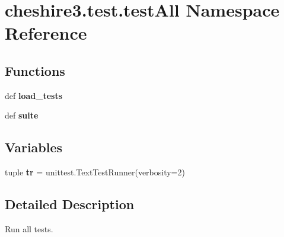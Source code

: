 \hypertarget{namespacecheshire3_1_1test_1_1test_all}{\section{cheshire3.\-test.\-test\-All Namespace Reference}
\label{namespacecheshire3_1_1test_1_1test_all}
}
\subsection*{Functions}
\begin{DoxyCompactItemize}
\item 
\hypertarget{namespacecheshire3_1_1test_1_1test_all_af7799fe65e7caad33ca065616dc9ead7}{def {\bfseries load\-\_\-tests}}\label{namespacecheshire3_1_1test_1_1test_all_af7799fe65e7caad33ca065616dc9ead7}

\item 
\hypertarget{namespacecheshire3_1_1test_1_1test_all_af9aaeda494ef46c1dd183532aa1a5b20}{def {\bfseries suite}}\label{namespacecheshire3_1_1test_1_1test_all_af9aaeda494ef46c1dd183532aa1a5b20}

\end{DoxyCompactItemize}
\subsection*{Variables}
\begin{DoxyCompactItemize}
\item 
\hypertarget{namespacecheshire3_1_1test_1_1test_all_a01215ea2dd6820c4c2589055487998a7}{tuple {\bfseries tr} = unittest.\-Text\-Test\-Runner(verbosity=2)}\label{namespacecheshire3_1_1test_1_1test_all_a01215ea2dd6820c4c2589055487998a7}

\end{DoxyCompactItemize}


\subsection{Detailed Description}
\begin{DoxyVerb}Run all tests.\end{DoxyVerb}
 